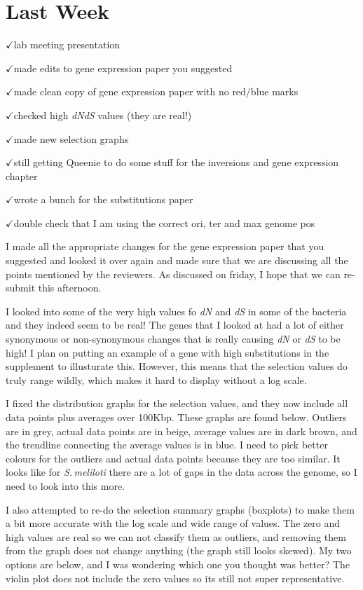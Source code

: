 \documentclass[12pt]{article}
\newcommand{\smel}{\textit{S.\,meliloti}\xspace}
\newcommand{\ch}{$\checkmark$}
\newcommand{\dn}{\textit{dN}\xspace}
\newcommand{\ds}{\textit{dS}\xspace}
\begin{document}
	
\section*{Last Week}

\ch lab meeting presentation

\ch made edits to gene expression paper you suggested

\ch made clean copy of gene expression paper with no red/blue marks

\ch checked high \dn \ds values (they are real!)

\ch made new selection graphs

\ch still getting Queenie to do some stuff for the inversions and gene expression chapter

\ch wrote a bunch for the substitutions paper

\ch double check that I am using the correct ori, ter and max genome pos


I made all the appropriate changes for the gene expression paper that you suggested and looked it over again and made sure that we are discussing all the points mentioned by the reviewers. 
As discussed on friday, I hope that we can re-submit this afternoon.

I looked into some of the very high values fo \dn and \ds in some of the bacteria and they indeed seem to be real! 
The genes that I looked at had a lot of either synonymous or non-synonymous changes that is really causing \dn or \ds to be high!
I plan on putting an example of a gene with high substitutions in the supplement to illusturate this.
However, this means that the selection values do truly range wildly, which makes it hard to display without a log scale.

I fixed the distribution graphs for the selection values, and they now include all data points plus averages over 100Kbp.
These graphs are found below. Outliers are in grey, actual data points are in beige, average values are in dark brown, and the trendline connecting the average values is in blue.
I need to pick better colours for the outliers and actual data points because they are too similar.
It looks like for \smel there are a lot of gaps in the data across the genome, so I need to look into this more.

I also attempted to re-do the selection summary graphs (boxplots) to make them a bit more accurate with the log scale and wide range of values.
The zero and high values are real so we can not classify them as outliers, and removing them from the graph does not change anything (the graph still looks skewed). My two options are below, and I was wondering which one you thought was better? The violin plot does not include the zero values so its still not super representative.
\end{document}
